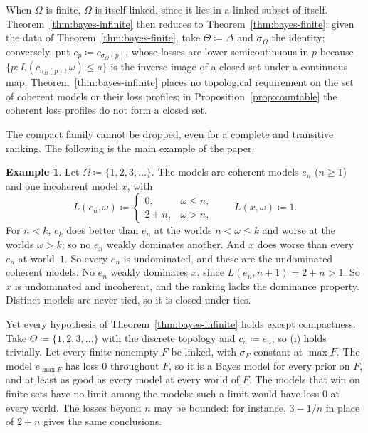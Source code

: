 \documentclass[11pt]{article}
\theoremstyle{definition}
\newtheorem{example}[theorem]{Example}
\theoremstyle{remark}
\begin{document}
When $\Omega$ is finite, $\Omega$ is itself linked, since it lies in a linked subset of itself. Theorem~\ref{thm:bayes-infinite} then reduces to Theorem~\ref{thm:bayes-finite}: given the data of Theorem~\ref{thm:bayes-finite}, take $\Theta\coloneqq\Delta$ and $\sigma_\Omega$ the identity; conversely, put $c_p\coloneqq c_{\sigma_\Omega(p)}$, whose losses are lower semicontinuous in $p$ because $\{p:L(c_{\sigma_\Omega(p)},\omega)\le a\}$ is the inverse image of a closed set under a continuous map. Theorem~\ref{thm:bayes-infinite} places no topological requirement on the set of coherent models or their loss profiles; in Proposition~\ref{prop:countable} the coherent loss profiles do not form a closed set.

The compact family cannot be dropped, even for a complete and transitive ranking. The following is the main example of the paper.

\begin{example}\label{ex:main}
Let $\Omega\coloneqq\{1,2,3,\dots\}$. The models are coherent models $e_n$ ($n\ge1$) and one incoherent model $x$, with
\[
L(e_n,\omega)\coloneqq\begin{cases}0,&\omega\le n,\\ 2+n,&\omega>n,\end{cases}\qquad L(x,\omega)\coloneqq1.
\]
For $n<k$, $e_k$ does better than $e_n$ at the worlds $n<\omega\le k$ and worse at the worlds $\omega>k$; so no $e_n$ weakly dominates another. And $x$ does worse than every $e_n$ at world~$1$. So every $e_n$ is undominated, and these are the undominated coherent models. No $e_n$ weakly dominates $x$, since $L(e_n,n+1)=2+n>1$. So $x$ is undominated and incoherent, and the ranking lacks the dominance property. Distinct models are never tied, so it is closed under ties.

Yet every hypothesis of Theorem~\ref{thm:bayes-infinite} holds except compactness. Take $\Theta\coloneqq\{1,2,3,\dots\}$ with the discrete topology and $c_n\coloneqq e_n$, so (i) holds trivially. Let every finite nonempty $F$ be linked, with $\sigma_F$ constant at $\max F$. The model $e_{\max F}$ has loss $0$ throughout $F$, so it is a Bayes model for every prior on $F$, and at least as good as every model at every world of $F$. The models that win on finite sets have no limit among the models: such a limit would have loss $0$ at every world. The losses beyond $n$ may be bounded; for instance, $3-1/n$ in place of $2+n$ gives the same conclusions.
\end{example}
\end{document}
